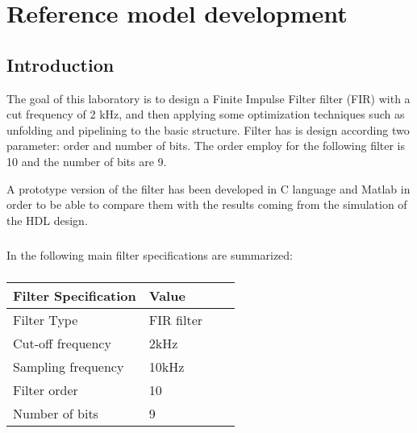 %

\chapter{Reference model development}
\label{chap1}
\graphicspath{ {./chapters/chap1images/} }
\section{Introduction}

The goal of this laboratory is to design a Finite Impulse Filter filter (FIR) with a cut frequency of 2 kHz, and then applying some optimization 
techniques such as unfolding and pipelining to the basic structure.
Filter has is design according two parameter: order and number of bits. The order employ for the following filter
is 10 and the number of bits are 9.

A prototype version of the filter has been developed in C language and Matlab in order to be able to compare them with the
results coming from the simulation of the HDL design.
\paragraph{}
In the following main filter specifications are summarized:
\paragraph{}
\begin{tabular}{ |p{3cm}||p{3cm}|p{3cm}|p{3cm}|  }
	\hline
	Filter Specification&Value \\
	\hline
	Filter Type   & FIR filter\\
	Cut-off frequency&   2kHz\\
	Sampling frequency &10kHz\\
	Filter order    &10\\
	Number of bits&   9\\
	\hline
   \end{tabular}

